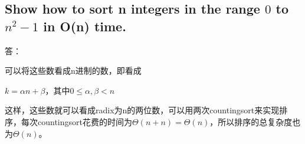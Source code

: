 \documentclass{article}
\begin{document}
\begin{CJK}{UTF8}{gbsn}
\subsection{Show how to sort n integers in the range $0$ to $n^2 - 1$ in O(n)
time.} 
答：

可以将这些数看成n进制的数，即看成
\newline

$k = \alpha n+\beta$，其中$0 \leq \alpha,\beta < n$
\newline

这样，这些数就可以看成radix为n的两位数，可以用两次countingsort来实现排序，每次countingsort花费的时间为$\Theta(n+n)
= \Theta(n)$，所以排序的总复杂度也为$\Theta(n)$。
\end{CJK}
\end{document}
